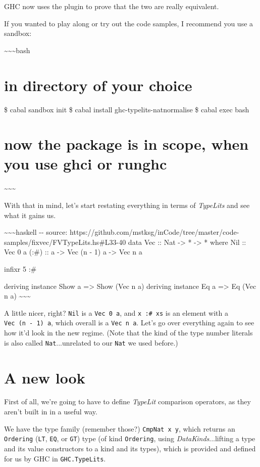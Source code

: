 \documentclass[]{article}
\begin{document}
GHC now uses the plugin to prove that the two are really equivalent.

If you wanted to play along or try out the code samples, I recommend you use a
sandbox:

\textasciitilde{}\textasciitilde{}\textasciitilde{}bash

\section{in directory of your choice}

\$ cabal sandbox init \$ cabal install ghc-typelits-natnormalise \$ cabal exec
bash

\section{now the package is in scope, when you use ghci or runghc}

\textasciitilde{}\textasciitilde{}\textasciitilde{}

With that in mind, let's start restating everything in terms of \emph{TypeLits}
and see what it gains us.

\textasciitilde{}\textasciitilde{}\textasciitilde{}haskell -\/- source:
https://github.com/mstksg/inCode/tree/master/code-samples/fixvec/FVTypeLits.hs\#L33-40
data Vec :: Nat -\textgreater{} * -\textgreater{} * where Nil :: Vec 0 a (:\#)
:: a -\textgreater{} Vec (n - 1) a -\textgreater{} Vec n a

infixr 5 :\#

deriving instance Show a =\textgreater{} Show (Vec n a) deriving instance Eq a
=\textgreater{} Eq (Vec n a) \textasciitilde{}\textasciitilde{}\textasciitilde{}

A little nicer, right? \texttt{Nil} is a \texttt{Vec\ 0\ a}, and
\texttt{x\ :\#\ xs} is an element with a \texttt{Vec\ (n\ -\ 1)\ a}, which
overall is a \texttt{Vec\ n\ a}. Let's go over everything again to see how it'd
look in the new regime. (Note that the kind of the type number literals is also
called \texttt{Nat}...unrelated to our \texttt{Nat} we used before.)

\section{A new look}

First of all, we're going to have to define \emph{TypeLit} comparison operators,
as they aren't built in in a useful way.

We have the type family (remember those?) \texttt{CmpNat\ x\ y}, which returns
an \texttt{Ordering} (\texttt{LT}, \texttt{EQ}, or \texttt{GT}) type (of kind
\texttt{Ordering}, using \emph{DataKinds}...lifting a type and its value
constructors to a kind and its types), which is provided and defined for us by
GHC in \texttt{GHC.TypeLits}.
\end{document}
